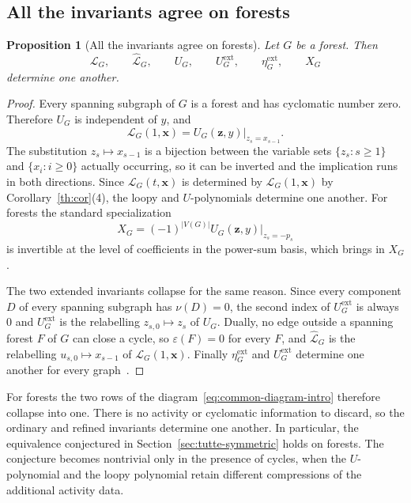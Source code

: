 \documentclass[11pt]{article}
\theoremstyle{plain}
\newtheorem{proposition}[theorem]{Proposition}
\theoremstyle{definition}
\renewcommand{\mathcal}{\mathscr}
\newcommand{\LL}{\mathcal{L}}    %
\newcommand{\bx}{\mathbf{x}}
\newcommand{\bz}{\mathbf{z}}
\newcommand{\eps}{\varepsilon}
\newcommand{\ext}{\mathrm{ext}}
\numberwithin{equation}{section}
\begin{document}
\subsection{All the invariants agree on forests}\label{subsec:forests}

\begin{proposition}[All the invariants agree on forests]\label{cor:forest-L-X}
Let $G$ be a forest.  Then
\[
   \LL_G,\qquad \widehat{\LL}_G,\qquad U_G,\qquad U^{\ext}_G,
   \qquad \eta^{\ext}_G,\qquad X_G
\]
determine one another.
\end{proposition}

\begin{proof}
Every spanning subgraph of $G$ is a forest and has cyclomatic number zero.
Therefore $U_G$ is independent of $y$, and
\[
   \LL_G(1,\bx)
   =
   \left.
      U_G(\bz,y)
   \right|_{z_s=x_{s-1}}.
\]
The substitution $z_s\mapsto x_{s-1}$ is a bijection between the variable sets $\{z_s:s\ge 1\}$
and $\{x_i:i\ge 0\}$ actually occurring, so it can be inverted and the implication runs in both directions.
Since $\LL_G(t,\bx)$ is determined by $\LL_G(1,\bx)$ by Corollary~\ref{th:cor}(4), the loopy and $U$-polynomials determine one another.
For forests the standard specialization
\[
   X_G=(-1)^{|V(G)|}
   \left.U_G(\bz,y)\right|_{z_s=-p_s}
\]
is invertible at the level of coefficients in the power-sum basis, which brings in $X_G$.

The two extended invariants collapse for the same reason.
Since every component $D$ of every spanning subgraph has $\nu(D)=0$, the second index of $U^{\ext}_G$ is always $0$ and $U^{\ext}_G$ is the relabelling $z_{s,0}\mapsto z_s$ of $U_G$.
Dually, no edge outside a spanning forest $F$ of $G$ can close a cycle, so $\eps(F)=0$ for every $F$, and $\widehat{\LL}_G$ is the relabelling $u_{s,0}\mapsto x_{s-1}$ of $\LL_G(1,\bx)$.
Finally $\eta^{\ext}_G$ and $U^{\ext}_G$ determine one another for every  graph~\cite[Corollary~4.13]{MN}.
\end{proof}

For forests the two rows of the diagram~\eqref{eq:common-diagram-intro}
therefore collapse into one.
There is no activity or cyclomatic information to discard,
so the ordinary and refined invariants determine one another.
In particular, the equivalence conjectured in
Section~\ref{sec:tutte-symmetric} holds on forests.  The conjecture becomes nontrivial
only in the presence of cycles, when the $U$-polynomial and the
loopy polynomial retain different compressions of the additional activity data.
\end{document}
